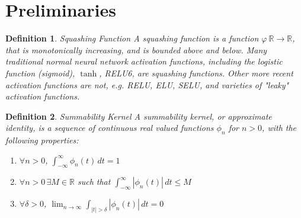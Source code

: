 \documentclass{article} %
\newtheorem{defn}{Definition}
\newcommand{\R}{\mathbb{R}}
\begin{document}
\section{Preliminaries}

\begin{defn}{Squashing Function}
A squashing function is a function $\varphi\:\R \to \R$, that is monotonically increasing, and is bounded above and below.
Many traditional normal neural network activation functions, including the logistic function (sigmoid), $\tanh$, RELU6, are squashing functions.
Other more recent activation functions are not, e.g. RELU, ELU, SELU, and varieties of "leaky" activation functions.
\end{defn}





\begin{defn}{Summability Kernel}
A summability kernel, or approximate identity, is a sequence of continuous real valued functions $\phi_n$ for $n>0$, with the following properties:
\begin{enumerate}
	\item $\forall n>0$, $\int_{-\infty}^{\infty}\phi_{n}(t)\,dt=1$
	\item $\forall n>0\, \exists M \in \R$ such that $\int_{-\infty}^{\infty}|\phi_{n}(t)|\,dt\le M$
	\item $\forall \delta > 0$, ${\displaystyle \lim_{n\to\infty}}\int_{|t|>\delta}|\phi_{n}(t)|\,dt = 0$
\end{enumerate}
\end{defn}
\end{document}
